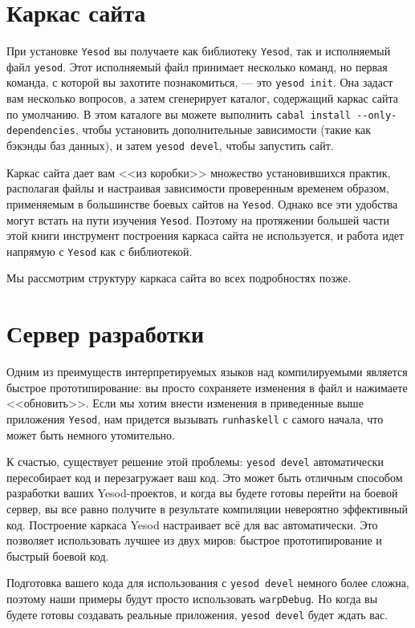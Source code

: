 \section{Каркас сайта}

При установке \texttt{Yesod} вы получаете как библиотеку \texttt{Yesod}, так и исполняемый
файл \texttt{yesod}. Этот исполняемый файл принимает несколько команд, но первая команда,
с которой вы захотите познакомиться, --- это \texttt{yesod init}. Она задаст вам несколько
вопросов, а затем сгенерирует каталог, содержащий каркас сайта по умолчанию. В этом
каталоге вы можете выполнить \lstinline'cabal install --only-dependencies', чтобы
установить дополнительные зависимости (такие как бэкэнды баз данных), и затем
\lstinline'yesod devel', чтобы запустить сайт.

Каркас сайта дает вам <<из коробки>> множество установившихся практик, располагая файлы и
настраивая зависимости проверенным временем образом, применяемым в большинстве боевых
сайтов на \texttt{Yesod}. Однако все эти удобства могут встать на пути изучения
\texttt{Yesod}. Поэтому на протяжении большей части этой книги инструмент построения
каркаса сайта не используется, и работа идет напрямую с \texttt{Yesod} как с библиотекой.

Мы рассмотрим структуру каркаса сайта во всех подробностях позже.

\section{Сервер разработки}

Одним из преимуществ интерпретируемых языков над компилируемыми является быстрое
прототипирование: вы просто сохраняете изменения в файл и нажимаете <<обновить>>. Если мы
хотим внести изменения в приведенные выше приложения \texttt{Yesod}, нам придется вызывать
\lstinline!runhaskell! с самого начала, что может быть немного утомительно.

К счастью, существует решение этой проблемы: \lstinline'yesod devel' автоматически
пересобирает код и перезагружает ваш код. Это может быть отличным способом разработки
ваших Yesod-проектов, и когда вы будете готовы перейти на боевой сервер, вы все равно
получите в результате компиляции невероятно эффективный код. Построение каркаса Yesod
настраивает всё для вас автоматически. Это позволяет использовать лучшее из двух миров:
быстрое прототипирование и быстрый боевой код.

Подготовка вашего кода для использования с \lstinline!yesod devel! немного более сложна,
поэтому наши примеры будут просто использовать \lstinline!warpDebug!. Но когда вы будете
готовы создавать реальные приложения, \lstinline'yesod devel' будет ждать вас.

